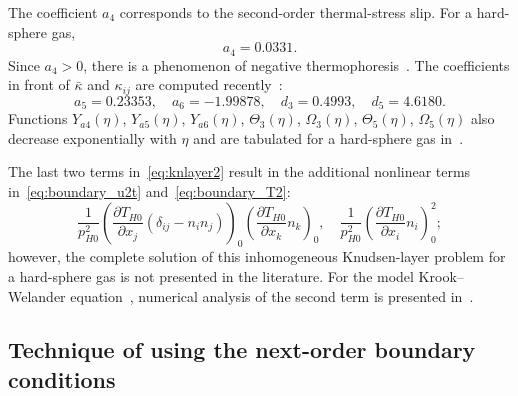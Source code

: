 \documentclass[10pt]{article}
\newcommand{\pder}[2][]{\frac{\partial#1}{\partial#2}}
\newcommand{\deltann}[2]{(\delta_{#1#2}-n_#1 n_#2)}
\newcommand{\onwall}[1]{\left(#1\right)_0}
\begin{document}
The coefficient \(a_4\) corresponds to the second-order thermal-stress slip.
For a hard-sphere gas,~\cite{Ohwada1992, Takata2015}
\begin{equation}\label{eq:a4_coeff}
    a_4 = 0.0331.
\end{equation}
Since \(a_4>0\), there is a phenomenon of negative thermophoresis~\cite{Ohwada1992}.
The coefficients in front of \(\bar\kappa\) and \(\kappa_{ij}\)
are computed recently~\cite{Takata2015curvature, Takata2015}:
\begin{equation}\label{eq:curvature_coeffs}
    a_5 = 0.23353, \quad a_6 = -1.99878, \quad d_3 = 0.4993, \quad d_5 = 4.6180.
\end{equation}
Functions \(Y_{a4}(\eta)\), \(Y_{a5}(\eta)\), \(Y_{a6}(\eta)\), \(\Theta_3(\eta)\),
\(\Omega_3(\eta)\), \(\Theta_5(\eta)\), \(\Omega_5(\eta)\) also decrease exponentially with \(\eta\)
and are tabulated for a hard-sphere gas in~\cite{Ohwada1992, Sone2002, Sone2007, Takata2015curvature, Takata2015}.

The last two terms in~\eqref{eq:knlayer2} result in the additional nonlinear terms
in~\eqref{eq:boundary_u2t} and~\eqref{eq:boundary_T2}:
\begin{equation}\label{eq:boundary_nonlinear}
    \frac1{p_{H0}^2}\onwall{\pder[T_{H0}]{x_j}\deltann{i}{j}}\onwall{\pder[T_{H0}]{x_k}n_k}, \quad
    \frac1{p_{H0}^2}\onwall{\pder[T_{H0}]{x_i}n_i}^2;
\end{equation}
however, the complete solution of this inhomogeneous Knudsen-layer problem
for a hard-sphere gas is not presented in the literature.
For the model Krook--Welander equation~\cite{Krook1954, Welander1954},
numerical analysis of the second term is presented in~\cite{Sone1970}.

\subsection{Technique of using the next-order boundary conditions}
\end{document}
